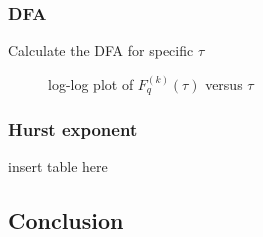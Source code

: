 \subsubsection{DFA}
Calculate the DFA for specific $\tau$

\begin{figure}[H]
	\centering
	\begin{subfigure}{\textwidth}
		
	\end{subfigure}

	\begin{subfigure}{\textwidth}
		
	\end{subfigure}
	\caption{log-log plot of $F_q^{( k )}(\tau )$ versus $\tau$}
\end{figure}

\subsubsection{Hurst exponent}
insert table here


\subsection{Conclusion}